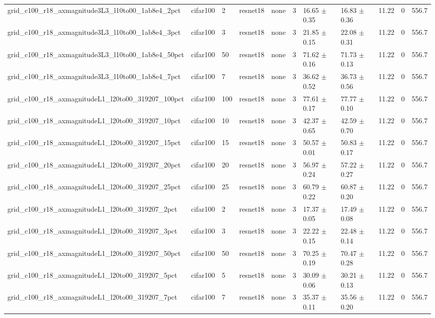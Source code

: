 \begin{tabular}{lllllllllll}
grid_c100_r18_axmagnitude3L3_l10to00_1ab8e4_2pct & cifar100 & 2 & resnet18 & none & 3 & 16.65 $\pm$ 0.35 & 16.83 $\pm$ 0.36 & 11.22 & 0 & 556.7 \\
grid_c100_r18_axmagnitude3L3_l10to00_1ab8e4_3pct & cifar100 & 3 & resnet18 & none & 3 & 21.85 $\pm$ 0.15 & 22.08 $\pm$ 0.31 & 11.22 & 0 & 556.7 \\
grid_c100_r18_axmagnitude3L3_l10to00_1ab8e4_50pct & cifar100 & 50 & resnet18 & none & 3 & 71.62 $\pm$ 0.16 & 71.73 $\pm$ 0.13 & 11.22 & 0 & 556.7 \\
grid_c100_r18_axmagnitude3L3_l10to00_1ab8e4_7pct & cifar100 & 7 & resnet18 & none & 3 & 36.62 $\pm$ 0.52 & 36.73 $\pm$ 0.56 & 11.22 & 0 & 556.7 \\
grid_c100_r18_axmagnitudeL1_l20to00_319207_100pct & cifar100 & 100 & resnet18 & none & 3 & 77.61 $\pm$ 0.17 & 77.77 $\pm$ 0.10 & 11.22 & 0 & 556.7 \\
grid_c100_r18_axmagnitudeL1_l20to00_319207_10pct & cifar100 & 10 & resnet18 & none & 3 & 42.37 $\pm$ 0.65 & 42.59 $\pm$ 0.70 & 11.22 & 0 & 556.7 \\
grid_c100_r18_axmagnitudeL1_l20to00_319207_15pct & cifar100 & 15 & resnet18 & none & 3 & 50.57 $\pm$ 0.01 & 50.83 $\pm$ 0.17 & 11.22 & 0 & 556.7 \\
grid_c100_r18_axmagnitudeL1_l20to00_319207_20pct & cifar100 & 20 & resnet18 & none & 3 & 56.97 $\pm$ 0.24 & 57.22 $\pm$ 0.27 & 11.22 & 0 & 556.7 \\
grid_c100_r18_axmagnitudeL1_l20to00_319207_25pct & cifar100 & 25 & resnet18 & none & 3 & 60.79 $\pm$ 0.22 & 60.87 $\pm$ 0.20 & 11.22 & 0 & 556.7 \\
grid_c100_r18_axmagnitudeL1_l20to00_319207_2pct & cifar100 & 2 & resnet18 & none & 3 & 17.37 $\pm$ 0.05 & 17.49 $\pm$ 0.08 & 11.22 & 0 & 556.7 \\
grid_c100_r18_axmagnitudeL1_l20to00_319207_3pct & cifar100 & 3 & resnet18 & none & 3 & 22.22 $\pm$ 0.15 & 22.48 $\pm$ 0.14 & 11.22 & 0 & 556.7 \\
grid_c100_r18_axmagnitudeL1_l20to00_319207_50pct & cifar100 & 50 & resnet18 & none & 3 & 70.25 $\pm$ 0.19 & 70.47 $\pm$ 0.28 & 11.22 & 0 & 556.7 \\
grid_c100_r18_axmagnitudeL1_l20to00_319207_5pct & cifar100 & 5 & resnet18 & none & 3 & 30.09 $\pm$ 0.06 & 30.21 $\pm$ 0.13 & 11.22 & 0 & 556.7 \\
grid_c100_r18_axmagnitudeL1_l20to00_319207_7pct & cifar100 & 7 & resnet18 & none & 3 & 35.37 $\pm$ 0.11 & 35.56 $\pm$ 0.20 & 11.22 & 0 & 556.7 \\

\end{tabular}
